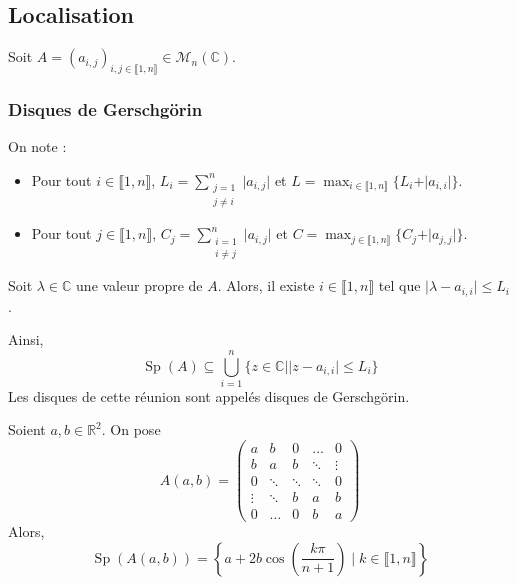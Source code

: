  \subsection{Localisation}
  
  Soit $A = (a_{i,j})_{i, j \in \llbracket 1, n \rrbracket} \in \mathcal{M}_n(\mathbb{C})$.
  
  \subsubsection{Disques de Gerschgörin}
  
  
  \begin{notation}
    On note :
    \begin{itemize}
      \item Pour tout $i \in \llbracket 1, n \rrbracket$, $L_i = \sum_{\substack{j=1 \\ j \neq i}}^n \vert a_{i,j} \vert$ et $L = \max_{i \in \llbracket 1, n \rrbracket} \{ L_i + \vert a_{i,i} \vert \}$.
      \item Pour tout $j \in \llbracket 1, n \rrbracket$, $C_j = \sum_{\substack{i=1 \\ i \neq j}}^n \vert a_{i,j} \vert$ et $C = \max_{j \in \llbracket 1, n \rrbracket} \{ C_j + \vert a_{j,j} \vert \}$.
    \end{itemize}
  \end{notation}
  
  \begin{theorem}
    \label{153-1}
    Soit $\lambda \in \mathbb{C}$ une valeur propre de $A$. Alors, il existe $i \in \llbracket 1, n \rrbracket$ tel que $\vert \lambda - a_{i,i} \vert \leq L_i$.
  \end{theorem}
  
  
  \begin{remark}
    Ainsi,
    \[ \operatorname{Sp}(A) \subseteq \bigcup_{i=1}^n \{ z \in \mathbb{C} \mid \vert z - a_{i,i} \vert \leq L_i \} \]
    Les disques de cette réunion sont appelés disques de Gerschgörin.
  \end{remark}
  
  
  \begin{example}
    Soient $a, b \in \mathbb{R}^2$. On pose
    \[
      A(a,b) =
       \begin{pmatrix}
         a & b & 0 & \dots & 0 \\
         b & a & b & \ddots & \vdots \\
         0 & \ddots & \ddots & \ddots & 0 \\
         \vdots & \ddots & b & a & b \\
         0 & \dots & 0 & b & a
       \end{pmatrix}
     \]
     Alors,
     \[ \operatorname{Sp}(A(a,b)) = \left\{ a + 2b \cos \left( \frac{k \pi}{n+1} \right) \mid k \in \llbracket 1, n \rrbracket \right\} \]
  \end{example}
  

